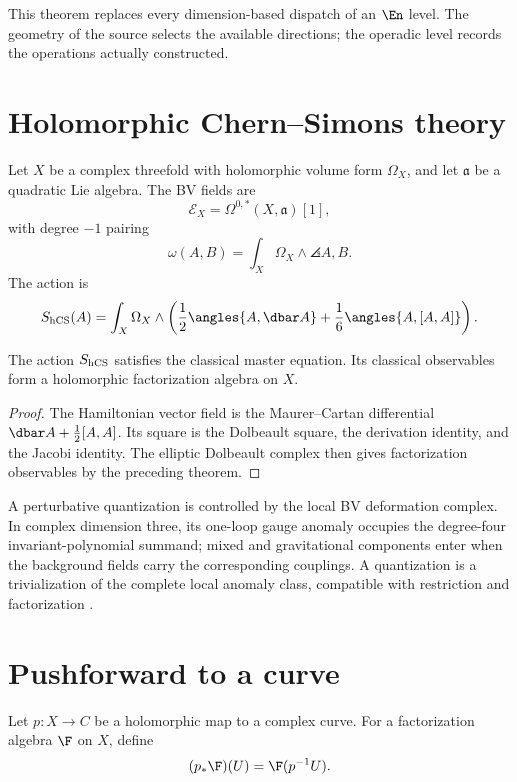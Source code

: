 This theorem replaces every dimension-based dispatch of an $\En$ level.  The geometry of the source selects the available directions; the operadic level records the operations actually constructed.

\chapter{Holomorphic Chern--Simons theory}
Let $X$ be a complex threefold with holomorphic volume form $\Omega_X$, and let $\mathfrak a$ be a quadratic Lie algebra. The BV fields are
\[
 \mathcal E_X=\Omega^{0,*}(X,\mathfrak a)[1],
\]
with degree $-1$ pairing
\[
 \omega(A,B)=\int_X\Omega_X\wedge\angles{A,B}.
\]
The action is
\[
 S_{\hCS}(A)=\int_X\Omega_X\wedge
 \left(\frac12\angles{A,\dbar A}+\frac16\angles{A,[A,A]}\right).
\]

\begin{theorem}
The action $S_{\mathrm{hCS}}$ satisfies the classical master equation. Its classical observables form a holomorphic factorization algebra on $X$.
\end{theorem}
\begin{proof}
The Hamiltonian vector field is the Maurer--Cartan differential $\dbar A+\frac12[A,A]$. Its square is the Dolbeault square, the derivation identity, and the Jacobi identity. The elliptic Dolbeault complex then gives factorization observables by the preceding theorem.
\end{proof}

A perturbative quantization is controlled by the local BV deformation complex. In complex dimension three, its one-loop gauge anomaly occupies the degree-four invariant-polynomial summand; mixed and gravitational components enter when the background fields carry the corresponding couplings. A quantization is a trivialization of the complete local anomaly class, compatible with restriction and factorization \cite{CostelloLiAnomaly}.

\chapter{Pushforward to a curve}
Let $p:X\to C$ be a holomorphic map to a complex curve. For a factorization algebra $\F$ on $X$, define
\[
 (p_*\F)(U)=\F(p^{-1}U).
\]

